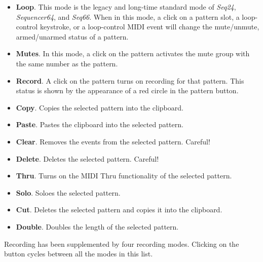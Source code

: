   \begin{itemize}
      \item \textbf{Loop}.
         This mode is the legacy and long-time standard mode of
         \textsl{Seq24}, \textsl{Sequencer64}, and \textsl{Seq66}.
         When in this mode, a click on a pattern slot, a loop-control
         keystroke, or a loop-control MIDI event will change the mute/unmute,
         armed/unarmed status of a pattern.
      \item \textbf{Mutes}.
         In this mode, a click on the pattern activates the
         mute group with the same number as the pattern.
      \item \textbf{Record}.
         A click on the pattern turns on recording for that pattern.
         This status is shown by the appearance of a red circle in the pattern
         button.
      \item \textbf{Copy}.
         Copies the selected pattern into the clipboard.
      \item \textbf{Paste}.
         Pastes the clipboard into the selected pattern.
      \item \textbf{Clear}.
         Removes the events from the selected pattern.  Careful!
      \item \textbf{Delete}.
         Deletes the selected pattern.  Careful!
      \item \textbf{Thru}.
         Turns on the MIDI Thru functionality of the selected pattern.
      \item \textbf{Solo}.
         Soloes the selected pattern.
      \item \textbf{Cut}.
         Deletes the selected pattern and copies it into the clipboard.
      \item \textbf{Double}.
         Doubles the length of the selected pattern.
   \end{itemize}
   Recording has been supplemented by four recording modes.
   Clicking on the button cycles between all the modes in this list.

